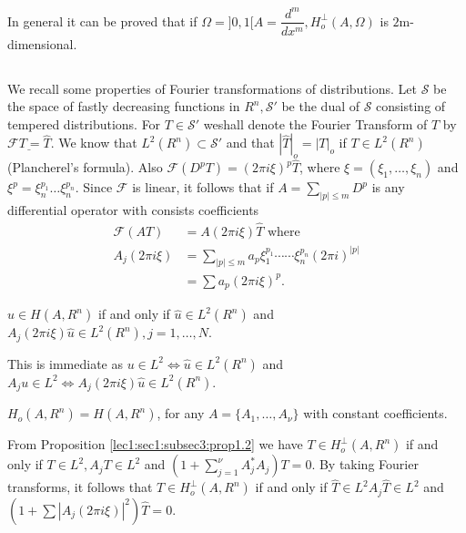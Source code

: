 In general it can be proved that if $\Omega =]0, 1[ A=
       \dfrac{d^m}{dx^m}, H^\perp_o (A, \Omega)$ is
       $2$m-dimensional. 

\subsection{}\label{lec1:sec1:subsec4} 

We recall some properties of Fourier transformations of
  distributions. Let $\mathscr{S}$ be the space of fastly decreasing
  functions in $R^n, \mathscr{S}'$ be the dual of $\mathscr{S}$
  consisting of tempered distributions. For $T \in \mathscr
  {S}'$ we\pageoriginale shall denote the Fourier Transform of $T$ by $\underline
  {\mathscr{F} T=\hat {T}}$. We know that $L^2 (R^n) \subset \mathscr
  {S}'$ and that $|\hat {T}|_o=|T|_o$ if $T \in L^2 (R^n)$
  (Plancherel's formula). Also $\mathscr {F}(D^p T)= (2 \pi i
  \xi)^p \hat {T}$, where $\xi =(\xi_1 , \ldots , \xi _n)$ and
  $\xi ^p =\xi^{p_1}_n \ldots \xi_n^{p_n}$. Since $\mathscr {F}$ is linear, it follows
  that if $A= \sum\limits_{|p|\le m} D^p$ is any differential operator
  with consists coefficients 
\begin{align*}
\mathscr {F} (A T)&= A(2 \pi i \xi) \hat{T} \text{ where }\\
  A_j(2 \pi i \xi)&= \sum _{|p|\le m} a_p \xi^{p_1}_1 \cdots \cdots
\xi^{p_n}_n (2 \pi i)^{|p|}\\ 
& = \sum a_p (2 \pi i \xi)^p.
\end{align*}

\begin{proposition}\label{lec1:sec1:subsec4:prop1.3}%
  $u \in H (A,R^n)$ if and only if $\hat{u} \in L^2
  (R^n)$ and $A_j (2 \pi i \xi ) \hat{u} \in L^2
  (R^n), j=1, \ldots ,N$. 
\end{proposition}

This is immediate as $u \in L^2 \Leftrightarrow \hat{u}
\in L^2(R^n)$ and $A_j u \in L^2 \Leftrightarrow A_j
(2 \pi i \xi) \hat{u} \in L^2 (R^n)$. 

\begin{proposition}\label{lec1:sec1:subsec4:prop1.4}%
  $H_o (A, R^n)=H(A,R^n)$, for any $A= \{ A_1 ,\ldots ,A_\nu \}$ with
  constant coefficients. 
\end{proposition}

From Proposition \ref{lec1:sec1:subsec3:prop1.2} we have $T \in H^ \perp _o (A, R^n)$ if
and only if $T \in L^2, A_j T \in L^2$ and $(1+ \sum
\limits_{j=1}^\nu A^*_j A_j)T=0$. By taking Fourier transforms, it follows
that $T \in H^ \perp _o (A,R^n)$ if and only if $\hat{T}
\in L^2 A_j \hat{T}\in L^2$ and $(1+\sum | A_j (2 \pi
i \xi)|^2) \hat{T}=0$. 



